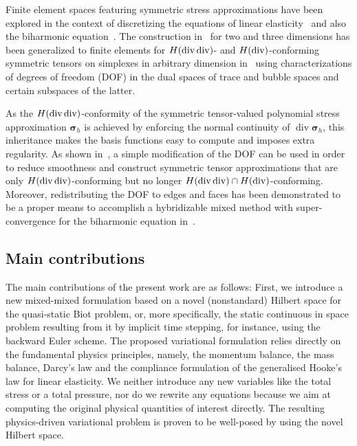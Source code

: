 \documentclass[11pt]{amsart}
\theoremstyle{remark}
\theoremstyle{definition}
\def\sig{{\bm \sigma}}
\renewcommand{\div}{\operatorname{div}}
\renewcommand{\div}{\operatorname{div}}
\def\sig{\boldsymbol \sigma}
\begin{document}
Finite element spaces featuring symmetric stress approximations have been explored in the context of discretizing the equations of linear elasticity~\cite{HuZhang2015} and also the biharmonic equation~\cite{HuMaZhang2021}. 
The construction in~\cite{HuMaZhang2021} for two and three dimensions has been generalized to finite elements for $H(\rm div \, \rm div)$- and $H(\rm div)$-conforming symmetric tensors on simplexes in arbitrary dimension in~\cite{ChenHuang2022} using characterizations of degrees of freedom (DOF) in the dual spaces of trace and bubble spaces and certain subspaces
of the latter. 

As the $H(\rm div \, \rm div)$-conformity of the symmetric tensor-valued polynomial stress approximation $\sig_h$ is achieved by enforcing the normal continuity of $\div \sig_h$, this inheritance makes the basis functions easy to compute and imposes extra regularity. As shown in~\cite{ChenHuang2022}, a simple modification of the DOF can be used in order to reduce smoothness and construct symmetric tensor approximations that are only $H(\rm div \, \rm div)$-conforming but no longer $H({\rm div} \, {\rm div}) \cap H({\rm div})$-conforming. Moreover, redistributing the DOF to edges and faces has been demonstrated to be a proper means to accomplish a hybridizable mixed method with super-convergence for the biharmonic equation in~\cite{ChenHuang2025}.

\subsection*{Main contributions}
The main contributions of the present work are as follows: First, we introduce a new mixed-mixed formulation
based on a novel (nonstandard) Hilbert space for the quasi-static Biot problem, or, more specifically, the static
continuous in space problem resulting from it by implicit time stepping, for instance, using the backward Euler
scheme. { The proposed variational formulation relies directly on the fundamental physics principles,
namely, the momentum balance, the mass balance, Darcy's law and the compliance formulation of the generalised
Hooke's law for linear elasticity. We neither introduce any new variables like the total stress or a total pressure, nor 
do we rewrite any equations because we aim at computing the original physical quantities of interest directly.}
The resulting physics-driven variational problem is proven to be well-posed by using the novel Hilbert space. 
\end{document}
